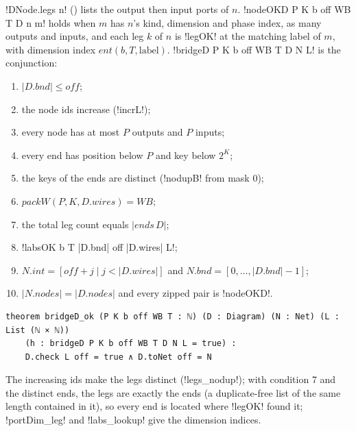 {\begin{definition}\label{def:boxes-bridgeD}
\lbx!DNode.legs n! () lists the output then input ports of $n$. \lbx!nodeOKD P K b off WB T D n m! holds when $m$ has $n$'s kind, dimension and phase index, as many outputs and inputs, and each leg $k$ of $n$ is \lbx!legOK! at the matching label of $m$, with dimension index $\mathit{ent}(b,T,\text{label})$. \lbx!bridgeD P K b off WB T D N L! is the conjunction:
\begin{enumerate}
\item $|D.\mathit{bnd}|\le\mathit{off}$;
\item the node ids increase (\lbx!incrL!);
\item every node has at most $P$ outputs and $P$ inputs;
\item every end has position below $P$ and key below $2^K$;
\item the keys of the ends are distinct (\lbx!nodupB! from mask $0$);
\item $\mathit{packW}(P,K,D.\mathit{wires})=\mathit{WB}$;
\item the total leg count equals $|\mathit{ends}\,D|$;
\item \lbx!labsOK b T |D.bnd| off |D.wires| L!;
\item $N.\mathit{int}=[\mathit{off}+j\mid j<|D.\mathit{wires}|]$ and $N.\mathit{bnd}=[0,\dots,|D.\mathit{bnd}|-1]$;
\item $|N.\mathit{nodes}|=|D.\mathit{nodes}|$ and every zipped pair is \lbx!nodeOKD!.
\end{enumerate}
\end{definition}

\begin{theorem}\label{thm:boxes-bridgeD}
\begin{lstlisting}[style=leanbox]
theorem bridgeD_ok (P K b off WB T : ℕ) (D : Diagram) (N : Net) (L : List (ℕ × ℕ))
    (h : bridgeD P K b off WB T D N L = true) :
    D.check L off = true ∧ D.toNet off = N
\end{lstlisting}
\end{theorem}
\noindent The increasing ids make the legs distinct (\lbx!legs_nodup!); with condition 7 and the distinct ends, the legs are exactly the ends (a duplicate-free list of the same length contained in it), so every end is located where \lbx!legOK! found it; \lbx!portDim_leg! and \lbx!labs_lookup! give the dimension indices.

}
